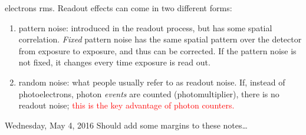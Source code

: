 \documentclass[12pt]{article}
\begin{document}
\begin{description}
        electrons rms. Readout effects can come in two different forms:
        \begin{enumerate}
            \item pattern noise: introduced in the readout process, but has
                some spatial correlation. \textit{Fixed} pattern noise has the
                same spatial pattern over the detector from exposure to
                exposure, and thus can be corrected. \textcolor{myBlue}{If the
                pattern noise is not fixed, it changes every time exposure is
                read out.}
            \item random noise: what people usually refer to as readout noise.
                If, instead of photoelectrons, photon \emph{events} are counted
                (photomultiplier), there is no readout noise;
                \textcolor{red}{this is the key advantage of photon counters.}
        \end{enumerate}

        \textcolor{date}{Wednesday, May 4, 2016} Should add some margins to
        these notes\ldots


\end{description}
\end{document}
